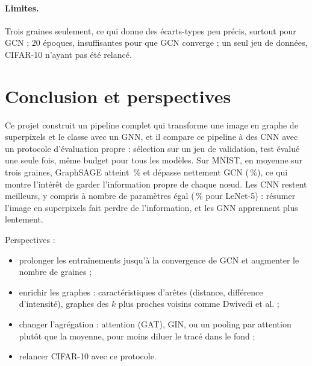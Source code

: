 \documentclass[11pt,a4paper]{article}
\newcommand{\pct}{\,\%}
\begin{document}
\paragraph{Limites.} Trois graines seulement, ce qui donne des écarts-types peu précis, surtout pour GCN ;
20 époques, insuffisantes pour que GCN converge ; un seul jeu de données, CIFAR-10 n'ayant pas été relancé.

\section{Conclusion et perspectives}
\label{sec:conclusion}

Ce projet construit un pipeline complet qui transforme une image en graphe de superpixels et le classe
avec un GNN, et il compare ce pipeline à des CNN avec un protocole d'évaluation propre : sélection sur un jeu de
validation, test évalué une seule fois, même budget pour tous les modèles. Sur MNIST, en moyenne sur trois
graines, GraphSAGE atteint
\testsage\pct{} et dépasse nettement GCN (\testgcn\pct), ce qui montre l'intérêt de garder l'information propre
de chaque nœud. Les CNN restent meilleurs, y compris à nombre de paramètres égal (\testlenet\pct{} pour LeNet-5) :
résumer l'image en superpixels fait perdre de l'information, et les GNN apprennent plus lentement.

Perspectives :
\begin{itemize}
  \item prolonger les entraînements jusqu'à la convergence de GCN et augmenter le nombre de graines ;
  \item enrichir les graphes : caractéristiques d'arêtes (distance, différence d'intensité), graphes des $k$ plus
  proches voisins comme Dwivedi et al. ;
  \item changer l'agrégation : attention (GAT), GIN, ou un pooling par attention plutôt que la moyenne, pour moins
  diluer le tracé dans le fond ;
  \item relancer CIFAR-10 avec ce protocole.
\end{itemize}
\end{document}
